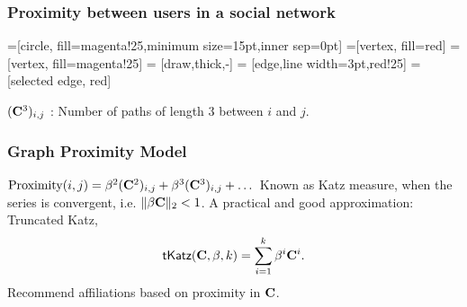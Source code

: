 \documentclass{beamer}
\begin{document}
\begin{frame}
\frametitle{Proximity between users in a social network}
=[circle, fill=magenta!25,minimum size=15pt,inner sep=0pt]
=[vertex, fill=red]
=[vertex, fill=magenta!25]
 = [draw,thick,-]
 = [edge,line width=3pt,red!25]
 = [selected edge, red]

\begin{center}
\end{center}
\pause
$(\mathbf{C}^{3})_{i,j}$ : Number of paths of length 3 between $i$ and $j$.
\end{frame}

\begin{frame}
\frametitle{Graph Proximity Model}
\begin{itemize}
\pitem $\text{Proximity}(i, j) = \beta^{2} (\mathbf{C}^{2})_{i,j} + \beta^{3}(\mathbf{C}^3)_{i,j} + \dots$
\pitem Known as Katz measure, when the series is convergent, i.e. $\|\beta \mathbf{C} \|_{2} < 1$.
\pitem A practical and good approximation: Truncated Katz,
\[ \textsf{tKatz}(\mathbf{C}, \beta, k) = \sum_{i=1}^{k} \beta^i \mathbf{C}^i. \]
\pitem Recommend affiliations based on proximity in $\mathbf{C}$.
\end{itemize}
\end{frame}
\end{document}
